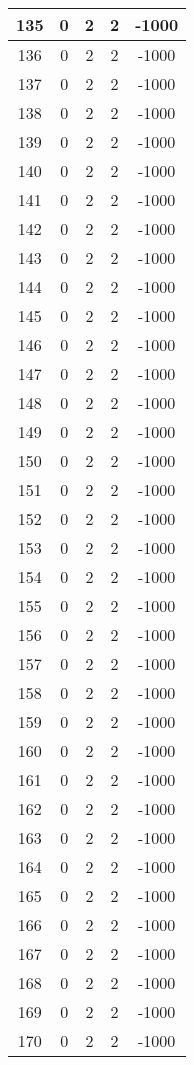 \documentclass[letterpaper, 12pt]{article}
\begin{document}
\begin{longtable}{|c|c|c|c|c|}
\hline
135 & 0 & 2 & 2 & -1000 \\
\hline
136 & 0 & 2 & 2 & -1000 \\
\hline
137 & 0 & 2 & 2 & -1000 \\
\hline
138 & 0 & 2 & 2 & -1000 \\
\hline
139 & 0 & 2 & 2 & -1000 \\
\hline
140 & 0 & 2 & 2 & -1000 \\
\hline
141 & 0 & 2 & 2 & -1000 \\
\hline
142 & 0 & 2 & 2 & -1000 \\
\hline
143 & 0 & 2 & 2 & -1000 \\
\hline
144 & 0 & 2 & 2 & -1000 \\
\hline
145 & 0 & 2 & 2 & -1000 \\
\hline
146 & 0 & 2 & 2 & -1000 \\
\hline
147 & 0 & 2 & 2 & -1000 \\
\hline
148 & 0 & 2 & 2 & -1000 \\
\hline
149 & 0 & 2 & 2 & -1000 \\
\hline
150 & 0 & 2 & 2 & -1000 \\
\hline
151 & 0 & 2 & 2 & -1000 \\
\hline
152 & 0 & 2 & 2 & -1000 \\
\hline
153 & 0 & 2 & 2 & -1000 \\
\hline
154 & 0 & 2 & 2 & -1000 \\
\hline
155 & 0 & 2 & 2 & -1000 \\
\hline
156 & 0 & 2 & 2 & -1000 \\
\hline
157 & 0 & 2 & 2 & -1000 \\
\hline
158 & 0 & 2 & 2 & -1000 \\
\hline
159 & 0 & 2 & 2 & -1000 \\
\hline
160 & 0 & 2 & 2 & -1000 \\
\hline
161 & 0 & 2 & 2 & -1000 \\
\hline
162 & 0 & 2 & 2 & -1000 \\
\hline
163 & 0 & 2 & 2 & -1000 \\
\hline
164 & 0 & 2 & 2 & -1000 \\
\hline
165 & 0 & 2 & 2 & -1000 \\
\hline
166 & 0 & 2 & 2 & -1000 \\
\hline
167 & 0 & 2 & 2 & -1000 \\
\hline
168 & 0 & 2 & 2 & -1000 \\
\hline
169 & 0 & 2 & 2 & -1000 \\
\hline
170 & 0 & 2 & 2 & -1000 \\

\end{longtable}
\end{document}
